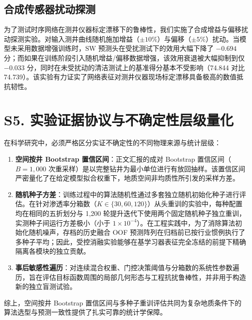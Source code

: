\documentclass[preprint,12pt,nopreprintline]{elsarticle}
\begin{document}
\subsection{合成传感器扰动探测}
为了测试时序网络在测井仪器标定漂移下的鲁棒性，我们实施了合成增益与偏移扰动探测实验。对输入测井曲线随机施加增益（$\pm 10\%$）与偏移（$\pm 5\%$）扰动。当模型未采用数据增强训练时，$\mathrm{SW}$ 预测头在受扰测试下的效用大幅下降了 $-0.694$ 分；而如果在训练阶段引入随机增益/偏移数据增强，该效用衰退被大幅抑制到仅 $-0.033$ 分，同时在未受扰动的清洁测试上的基准得分基本不受影响（74.844 对比 74.739）。该实验有力证实了网络表征对测井仪器现场标定漂移具备极高的数值抵抗韧性。

\section{S5. 实验证据协议与不确定性层级量化}
\label{sec:supp-protocols}
在科学研究中，必须严格区分实证不确定性的不同物理来源与统计层级：
\begin{enumerate}
\item \textbf{空间按井 Bootstrap 置信区间}：正文汇报的成对 Bootstrap 置信区间（$B=1,000$ 次重采样）是以完整钻井为最小单位进行有放回抽样。该置信区间严密量化了在给定模型拟合权重下，地质空间非均质性所引发的采样方差。
\item \textbf{随机种子方差}：训练过程中的算法随机性通过多套独立随机初始化种子进行评估。在针对渗透率分箱数（$K \in \{30, 60, 120\}$）从头重训的实验中，每种配置均在相同的五折划分与 1,200 轮提升迭代下使用两个固定随机种子独立重训，实测种子间运行方差极小（小于 $1 \times 10^{-4}$）。在工程实践中，为了消除算法初始化随机噪声，存档的历史融合 OOF 预测阵列在归档前已按行业惯例执行了多种子平均；因此，受控消融实验能够在基学习器表征完全冻结的前提下精确隔离各模块的独立贡献。
\item \textbf{事后敏感性遍历}：对连续混合权重、门控决策阈值与分箱数的系统性参数遍历，旨在评估目标函数周围的局部几何形态与工程抗扰鲁棒性，并非用于构造新的独立盲测试验。
\end{enumerate}
综上，空间按井 Bootstrap 置信区间与多种子重训评估共同为复杂地质条件下的算法选型与预测一致性提供了扎实可靠的统计学保障。



\end{document}
